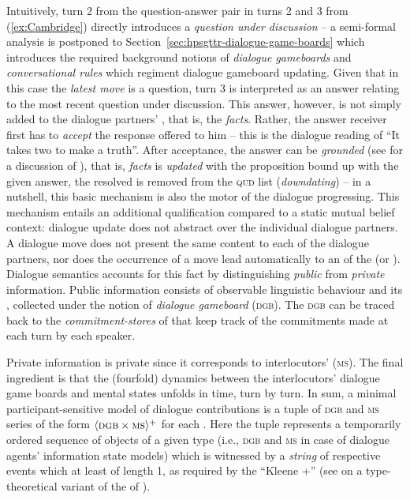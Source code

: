 \documentclass[output=paper]{langsci/langscibook}
\begin{document}
{Intuitively, turn 2 from the question-answer pair in turns 2 and 3 from (\ref{ex:Cambridge}) directly introduces a \emph{question under discussion} -- a semi-formal analysis is postponed to Section~\ref{sec:hpsgttr-dialogue-game-boards} which introduces the required background notions of \emph{dialogue gameboards} and \emph{conversational rules} which regiment dialogue gameboard updating.
%
Given that in this case the \emph{latest move} is a question, turn 3 is interpreted as an answer relating to the most recent question under discussion.
%
This answer, however, is not simply added to the dialogue partners' , that is, the \emph{facts}.
%
Rather, the answer receiver first has to \emph{accept}  the response offered to him -- this is the dialogue reading of \enquote{It takes two to make a truth}.
%
After acceptance, the answer can be \emph{grounded}  (see \citet[Chap.~4]{Clark:1996} for a discussion of ), that is, \emph{facts} is \emph{updated}  with the proposition bound up with the given answer, the resolved  is removed from the \textsc{qud} list (\emph{downdating})  -- in a nutshell, this basic mechanism is also the motor of the dialogue progressing. 
%
This mechanism entails an additional qualification compared to a static mutual belief context: dialogue update does not abstract over the individual dialogue partners.
%
A dialogue move does not present the same content to each of the dialogue partners, nor does the occurrence of a move lead automatically to an  of the  (or ).
%
Dialogue semantics accounts for this fact by distinguishing \emph{public}  from \emph{private} information.  
%
Public information consists of observable linguistic behaviour and its , collected under the notion of \emph{dialogue gameboard} (\textsc{dgb}). 
%
The \textsc{dgb} can be traced back to the \emph{commitment-stores}  of \citet{Hamblin:1970} that keep track of the commitments made at each turn by each speaker. 

Private information is private since it corresponds to interlocutors'  (\textsc{ms}).
%
The final ingredient is that the (fourfold) dynamics between the interlocutors' dialogue game boards and mental states unfolds in time, turn by turn.
%
In sum, a minimal participant-sensitive model of dialogue contributions is a tuple of \textsc{dgb} and \textsc{ms} series of the form $\langle \textsc{dgb} \times \textsc{ms} \rangle^+$ for each . 
%
Here the tuple represents a temporarily ordered sequence of objects of a given type (i.e., \textsc{dgb} and \textsc{ms} in case of dialogue agents' information state models)  which is witnessed by a \emph{string}  of respective events which at least of length 1, as required by the \enquote{Kleene +} \is{+}  (see \citet[Sec.~2.7]{Cooper:Ginzburg:2015} on a type-theoretical variant of the  of \citet{Fernando:2011}).

}
\end{document}

